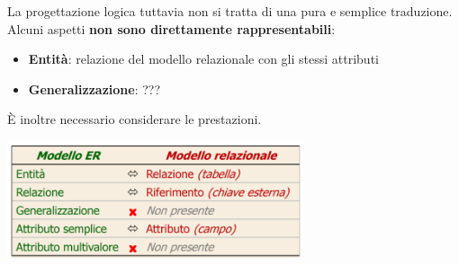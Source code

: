 \documentclass[12pt]{article}
\begin{document}
La progettazione logica tuttavia non si tratta di una pura e semplice traduzione.
Alcuni aspetti \textbf{non sono direttamente rappresentabili}:
\begin{itemize}
    \item \textbf{Entità}: relazione del modello relazionale con gli stessi attributi
    \item \textbf{Generalizzazione}: ???
\end{itemize}
È inoltre necessario considerare le prestazioni.
\begin{center}
    \includegraphics[width = 0.65\textwidth]{Images/88.PNG}
\end{center}
\end{document}
